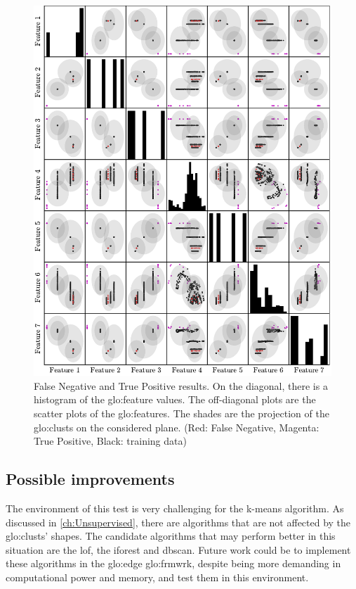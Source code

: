 \begin{figure}
    \centering
    \includegraphics{Images/shaker/ConfusionMatrix.pdf}
    \caption{False Negative and True Positive results. On the diagonal, there is a histogram of the \gls{glo:feature} values. The off-diagonal plots are the scatter plots of the \gls{glo:feature}s. The shades are the projection of the \gls{glo:clust}s on the considered plane. (Red: False Negative, Magenta: True Positive, Black: training data)}
    \label{fig:shaker_conf_matrix}
\end{figure}
\clearpage

\subsection{Possible improvements}
The environment of this test is very challenging for the k-means algorithm. As discussed in \autoref{ch:Unsupervised}, there are algorithms that are not affected by the \gls{glo:clust}s' shapes. The candidate algorithms that may perform better in this situation are the \gls{lof}, the \gls{iforest} and \gls{dbscan}. Future work could be to implement these algorithms in the \gls{glo:edge} \gls{glo:frmwrk}, despite being more demanding in computational power and memory, and test them in this environment.


